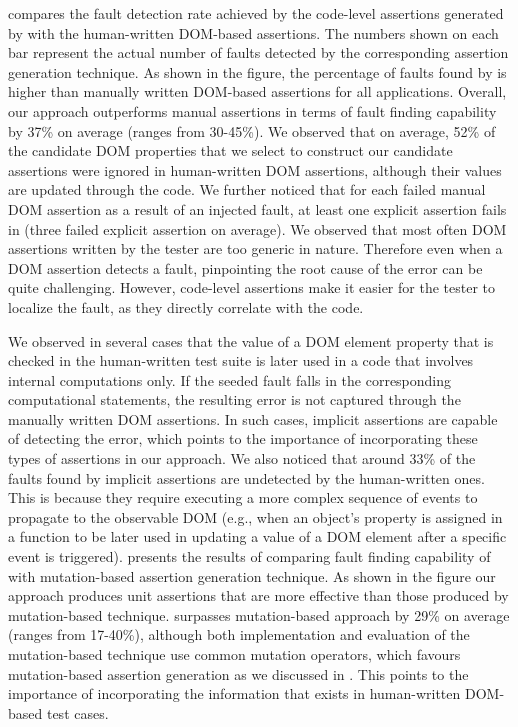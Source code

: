  compares the fault detection rate achieved by the code-level assertions generated by \atrina with the human-written DOM-based assertions. The numbers shown on each bar represent the actual number of faults detected by the corresponding assertion generation technique. As shown in the figure, the percentage of faults found by \atrina is higher than manually written DOM-based assertions for all applications. Overall, our approach outperforms manual assertions in terms of fault finding capability by 37\% on average (ranges from 30-45\%). We observed that on average, 52\% of the candidate DOM properties that we select to construct our candidate assertions were ignored in human-written DOM assertions, although their values are updated through the \javascript code.
We further noticed that for each failed manual DOM assertion as a result of an injected fault, at least one explicit assertion fails in \atrina (three failed explicit assertion on average).
We observed that most often DOM assertions written by the tester are too generic in nature. Therefore even when a DOM assertion detects a \javascript fault, pinpointing the root cause of the error can be quite challenging. However, code-level assertions make it easier for the tester to localize the fault, as they directly correlate with the code.

We observed in several cases that the value of a DOM element property that is checked in the human-written test suite is later used in a \javascript code that involves internal computations only. If the seeded fault falls in the corresponding computational statements, the resulting error is not captured through the manually written DOM assertions. In such cases, implicit assertions are capable of detecting the error, which points to the importance of incorporating these types of assertions in our approach. We also noticed that around 33\% of the faults found by implicit assertions are undetected by the human-written ones. This is because they require executing a more complex sequence of events to propagate to the observable DOM (e.g., when an object's property is assigned in a function to be later used in updating a value of a DOM element after a specific event is triggered).    
 presents the results of comparing fault finding capability of \atrina with mutation-based assertion generation technique. As shown in the figure our approach produces unit assertions that are more effective than those produced by mutation-based technique. \atrina surpasses mutation-based approach by 29\% on average (ranges from 17-40\%), although both implementation and evaluation of the mutation-based technique use common mutation operators, which favours mutation-based assertion generation as we discussed in . This points to the importance of incorporating the information that exists in human-written DOM-based test cases.       


